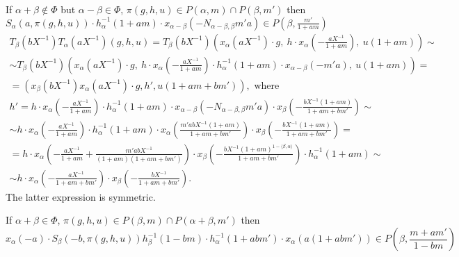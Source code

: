 \documentclass[oneside, 8pt]{amsart}
\theoremstyle{remark}
\theoremstyle{definition}
\numberwithin{equation}{section}
\begin{document}
If $\alpha + \beta \not \in \Phi$ but $\alpha - \beta \in \Phi$, $\pi(g, h, u) \in P(\alpha, m) \cap P(\beta, m')$ then
$S_\alpha(a, \pi(g, h, u))\cdot  h^{-1}_\alpha(1 + am) \cdot x_{\alpha-\beta}(-N_{\alpha-\beta, \beta}m'a) \in P(\beta, \frac{m'}{1 + am})$
\begin{multline}
 T_\beta(bX^{-1}) T_\alpha(aX^{-1}) \left(g, h, u\right) = 
 T_\beta(bX^{-1}) \left(x_\alpha(aX^{-1})\cdot g,\ h \cdot x_\alpha\left(-\frac{aX^{-1}}{1 + am}\right) ,\ u(1 + am)\right) \sim \\ 
 \sim T_\beta(bX^{-1}) \left(x_\alpha(aX^{-1})\cdot g,\ h \cdot x_\alpha\left(-\frac{aX^{-1}}{1 + am}\right) \cdot h^{-1}_\alpha(1 + am) \cdot x_{\alpha-\beta}(-m'a),\ u(1 + am)\right) = \\
 = (x_\beta(bX^{-1}) x_\alpha(aX^{-1}) \cdot g, h', u(1 + am + bm')), \text{ where} \end{multline} 
 \begin{multline}
 h' = h \cdot x_\alpha\left(-\frac{aX^{-1}}{1 + am}\right) \cdot h^{-1}_\alpha(1 + am) \cdot x_{\alpha-\beta}(-N_{\alpha-\beta, \beta}m'a) \cdot x_\beta\left(-\frac{bX^{-1}(1+am)}{1 + am + bm'}\right) \sim \\
    \sim h \cdot x_\alpha\left(-\frac{aX^{-1}}{1 + am}\right) \cdot h^{-1}_\alpha(1 + am) \cdot x_{\alpha}\left(\frac{m'abX^{-1}(1+am)}{1 + am + bm'}\right) \cdot x_\beta\left(-\frac{bX^{-1}(1+am)}{1 + am + bm'}\right) = \\
 = h \cdot x_\alpha\left(-\frac{aX^{-1}}{1 + am} + \frac{m'abX^{-1}}{(1+am)(1 + am + bm')}\right) \cdot x_\beta\left(-\frac{bX^{-1}(1+am)^{1 -\langle \beta, \alpha \rangle}}{1 + am + bm'}\right) \cdot h^{-1}_\alpha(1 + am) \sim \\
 \sim h \cdot x_\alpha\left(-\frac{aX^{-1}}{1 + am + bm'}\right) \cdot x_\beta\left(-\frac{bX^{-1}}{1 + am + bm'}\right).
\end{multline}
The latter expression is symmetric.

If $\alpha + \beta \in \Phi$, $\pi(g, h, u) \in P(\beta, m) \cap P(\alpha + \beta, m')$ then
\[x_\alpha(-a) \cdot S_\beta(-b, \pi(g, h, u)) h_{\beta}^{-1}(1-bm)\cdot h_{\alpha}^{-1}(1 + abm')\cdot x_{\alpha}(a(1 + abm')) \in P\left(\beta, \frac{m + am'}{1-bm}\right)\]
\end{document}
